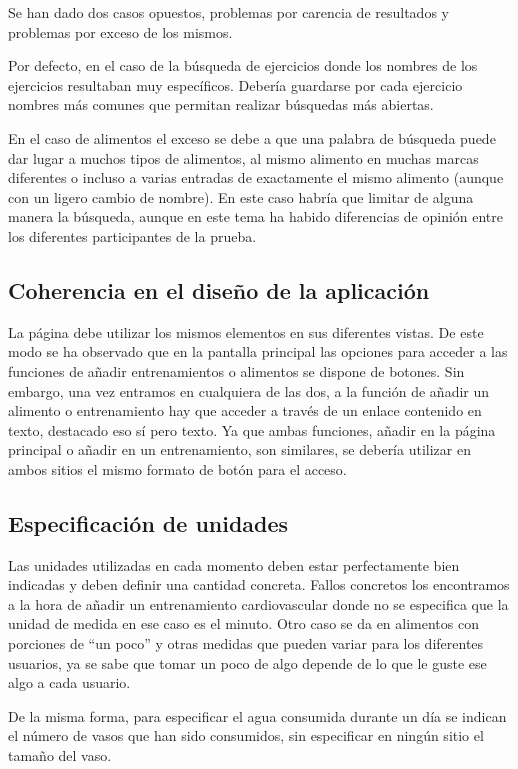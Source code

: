 \documentclass[a4paper]{article}
\begin{document}
	Se han dado dos casos opuestos, problemas por carencia de resultados y problemas por exceso de los mismos.
	
	Por defecto, en el caso de la búsqueda de ejercicios donde los nombres de los ejercicios resultaban muy específicos. Debería guardarse por cada ejercicio nombres más comunes que permitan realizar búsquedas más abiertas.
	
	En el caso de alimentos el exceso se debe a que una palabra de búsqueda puede dar lugar a muchos tipos de alimentos, al mismo alimento en muchas marcas diferentes o incluso a varias entradas de exactamente el mismo alimento (aunque con un ligero cambio de nombre). En este caso habría que limitar de alguna manera la búsqueda, aunque en este tema ha habido diferencias de opinión entre los diferentes participantes de la prueba.
	
	\subsection{Coherencia en el diseño de la aplicación}
	
	La página debe utilizar los mismos elementos en sus diferentes vistas. De este modo se ha observado que en la pantalla principal las opciones para acceder a las funciones de añadir entrenamientos o alimentos se dispone de botones. Sin embargo, una vez entramos en cualquiera de las dos, a la función de añadir un alimento o entrenamiento hay que acceder a través de un enlace contenido en texto, destacado eso sí pero texto. Ya que ambas funciones, añadir en la página principal o añadir en un entrenamiento, son similares, se debería utilizar en ambos sitios el mismo formato de botón para el acceso.
	
	\subsection{Especificación de unidades}
	
	Las unidades utilizadas en cada momento deben estar perfectamente bien indicadas y deben definir una cantidad concreta. Fallos concretos los encontramos a la hora de añadir un entrenamiento cardiovascular donde no se especifica que la unidad de medida en ese caso es el minuto. Otro caso se da en alimentos con porciones de ``un poco'' y otras medidas que pueden variar para los diferentes usuarios, ya se sabe que tomar un poco de algo depende de lo que le guste ese algo a cada usuario.
	
	De la misma forma, para especificar el agua consumida durante un día se indican el número de vasos que han sido consumidos, sin especificar en ningún sitio el tamaño del vaso.
	
\end{document}
